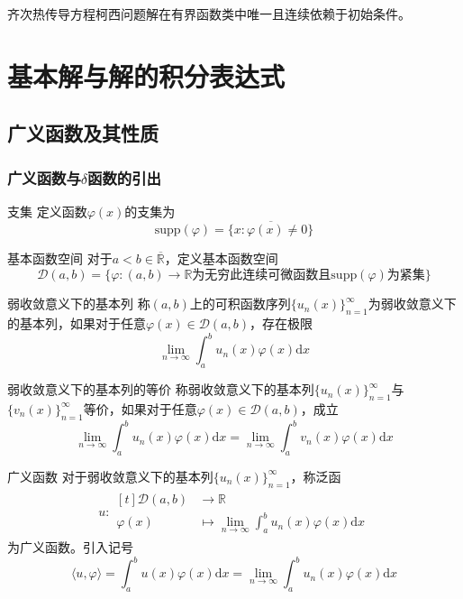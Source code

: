 \documentclass[lang = cn, scheme = chinese, thmcnt = section]{elegantbook}
\newcommand{\R}{\mathbb{R}}            %
\newcommand{\dd}{\mathrm{d}}           %
\begin{document}
\begin{theorem}
	齐次热传导方程柯西问题解在有界函数类中唯一且连续依赖于初始条件。
\end{theorem}

\chapter{基本解与解的积分表达式}

\section{广义函数及其性质}

\subsection{广义函数与$\delta$函数的引出}

\begin{definition}{支集}
	定义函数$\varphi(x)$的支集为%
	$$
	\text{supp}(\varphi)=\overline{\{ x:\varphi(x)\ne 0 \}}
	$$
\end{definition}

\begin{definition}{基本函数空间}
	对于$a<b\in\overline{\R}$，定义基本函数空间
	$$
	\mathscr{D}(a,b)=\{ \varphi:(a,b)\to\R\text{为无穷此连续可微函数且}\text{supp}(\varphi)\text{为紧集} \}
	$$
\end{definition}

\begin{definition}{弱收敛意义下的基本列}
	称$(a,b)$上的可积函数序列$\{ u_n(x) \}_{n=1}^{\infty}$为弱收敛意义下的基本列，如果对于任意$\varphi(x)\in \mathscr{D}(a,b)$，存在极限%
	$$
	\lim_{n\to\infty}\int_{a}^{b}u_n(x)\varphi(x)\dd x
	$$
\end{definition}

\begin{definition}{弱收敛意义下的基本列的等价}
	称弱收敛意义下的基本列$\{ u_n(x) \}_{n=1}^{\infty}$与$\{ v_n(x) \}_{n=1}^{\infty}$等价，如果对于任意$\varphi(x)\in \mathscr{D}(a,b)$，成立
	$$
	\lim_{n\to\infty}\int_{a}^{b}u_n(x)\varphi(x)\dd x
	=\lim_{n\to\infty}\int_{a}^{b}v_n(x)\varphi(x)\dd x
	$$
\end{definition}

\begin{definition}{广义函数}
	对于弱收敛意义下的基本列$\{ u_n(x) \}_{n=1}^{\infty}$，称泛函
	\begin{align*}
		u:\begin{aligned}[t]
			\mathscr{D}(a,b) &\longrightarrow \R\\
			\varphi(x) &\longmapsto \lim_{n\to\infty}\int_{a}^{b}u_n(x)\varphi(x)\dd x
		\end{aligned}
	\end{align*}
	为广义函数。引入记号
	$$
	\langle u,\varphi \rangle
	=\int_{a}^{b}u(x)\varphi(x)\dd x
	=\lim_{n\to\infty}\int_{a}^{b}u_n(x)\varphi(x)\dd x
	$$
\end{definition}
\end{document}
